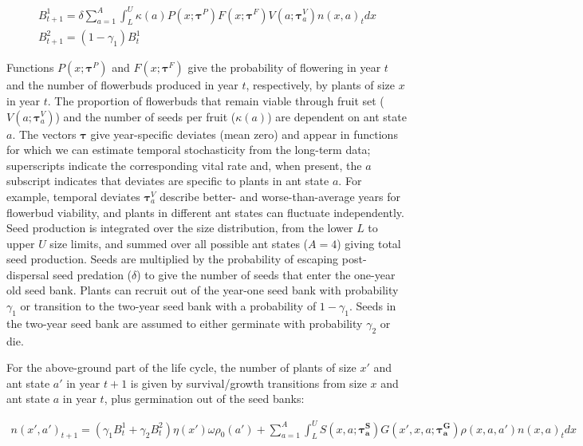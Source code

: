 \documentclass[11pt]{article}
\begin{document}
	\begin{gather}
B^1_{t+1} = \delta \sum_{a=1}^{A} \int_L^U  \kappa(a) P(x;\pmb{\tau}^P) F(x;\pmb{\tau}^F) V(a;\pmb{\tau}^V_{a}) n(x,a)_{t} dx \\
B^2_{t+1} =  (1 - \gamma_1)B^1_{t}
	\label{eqn:IPM1}
	\end{gather}

\noindent
Functions $P(x;\pmb{\tau}^P)$ and $F(x;\pmb{\tau}^F)$ give the probability of flowering in year $t$ and the number of flowerbuds produced in year $t$, respectively, by plants of size $x$ in year $t$. 
The proportion of flowerbuds that remain viable through fruit set ($V(a;\pmb{\tau}^V_{a})$) and the number of seeds per fruit ($\kappa(a)$) are dependent on ant state $a$. 
The vectors $\pmb{\tau}$ give year-specific deviates (mean zero) and appear in functions for which we can estimate temporal stochasticity from the long-term data; superscripts indicate the corresponding vital rate and, when present, the $a$ subscript indicates that deviates are specific to plants in ant state $a$.
For example, temporal deviates $\pmb{\tau}^V_{a}$ describe better- and worse-than-average years for flowerbud viability, and plants in different ant states can fluctuate independently.
Seed production is integrated over the size distribution, from the lower $L$ to upper $U$ size limits, and summed over all possible ant states ($A=4$) giving total seed production. 
Seeds are multiplied by the probability of escaping post-dispersal seed predation ($\delta$) to give the number of seeds that enter the one-year old seed bank. 
Plants can recruit out of the year-one seed bank with probability $\gamma_1$ or transition to the two-year seed bank with a probability of $1 - \gamma_1$. 
Seeds in the two-year seed bank are assumed to either germinate with probability $\gamma_2$ or die.

For the above-ground part of the life cycle, the number of plants of size $x'$ and ant state $a'$ in year $t+1$ is given by survival/growth transitions from size $x$ and ant state $a$ in year $t$, plus germination out of the seed banks:

	\begin{gather}
		\label{eqn:IPM2}
n(x',a')_{t+1} = (\gamma_1 B^1_{t} + \gamma_2 B^2_{t} ) \eta(x') \omega \rho_{0}(a')  + 
\sum_{a=1}^{A} \int_L^U S(x,a;\pmb{\tau^S_{a}}) G(x',x,a;\pmb{\tau^G_{a}}) \rho(x,a,a') n(x,a)_t dx 
	\end{gather}
\end{document}
